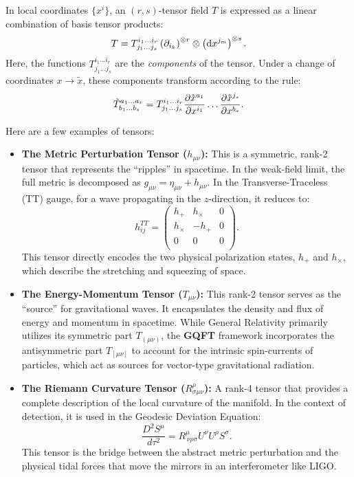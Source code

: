 In local coordinates $\{x^i\}$, an $(r,s)$-tensor field $T$ is expressed as a linear combination of basis tensor products:
\[%
  T = T^{i_1 \dots i_r}_{j_1 \dots j_s} \left(\pd{i_k}\right)^{\otimes r} \otimes \left(\dx^{j_m}\right)^{\otimes s}
.\]%
Here, the functions $T^{i_1 \dots i_r}_{j_1 \dots j_s}$ are the \emph{components} of the tensor. Under a change of coordinates $x \to \tilde{x}$, these components transform according to the rule:
\[%
  \tilde{T}^{a_1 \dots a_r}_{b_1 \dots b_s} = T^{i_1 \dots i_r}_{j_1 \dots j_s} \pdv{\tilde{x}^{a_1}}{x^{i_1}} \dots \pdv{\tilde{x}^{j_s}}{x^{b_s}}
.\]%

Here are a few examples of tensors:
\begin{example}\leavevmode
  \begin{itemize}
    \item \textbf{The Metric Perturbation Tensor ($h_{\mu\nu}$):} This is a symmetric, rank-2 tensor that represents the ``ripples'' in spacetime. In the weak-field limit, the full metric is decomposed as $g_{\mu\nu} = \eta_{\mu\nu} + h_{\mu\nu}$. In the Transverse-Traceless (TT) gauge, for a wave propagating in the $z$-direction, it reduces to:
      \[%
        h_{ij}^{TT} = \begin{pmatrix}
          h_+ & h_\times & 0 \\
          h_\times & -h_+ & 0 \\
          0 & 0 & 0 \\
        \end{pmatrix}
      .\]%
      This tensor directly encodes the two physical polarization states, $h_+$ and $h_\times$, which describe the stretching and squeezing of space.
    \item \textbf{The Energy-Momentum Tensor ($T_{\mu\nu}$):} This rank-2 tensor serves as the ``source'' for gravitational waves. It encapsulates the density and flux of energy and momentum in spacetime. While General Relativity primarily utilizes its symmetric part $T_{(\mu\nu)}$, the \textbf{GQFT} framework incorporates the antisymmetric part $T_{[\mu\nu]}$ to account for the intrinsic spin-currents of particles, which act as sources for vector-type gravitational radiation.
    \item \textbf{The Riemann Curvature Tensor ($R^{\rho}_{\sigma\mu\nu}$):} A rank-4 tensor that provides a complete description of the local curvature of the manifold. In the context of detection, it is used in the Geodesic Deviation Equation:
      \[%
        \frac{D^2 S^\mu}{d\tau^2} = R^\mu_{\, \nu\rho\sigma} U^\nu U^\rho S^\sigma
      .\]%
      This tensor is the bridge between the abstract metric perturbation and the physical tidal forces that move the mirrors in an interferometer like LIGO.
  \end{itemize}
\end{example}

